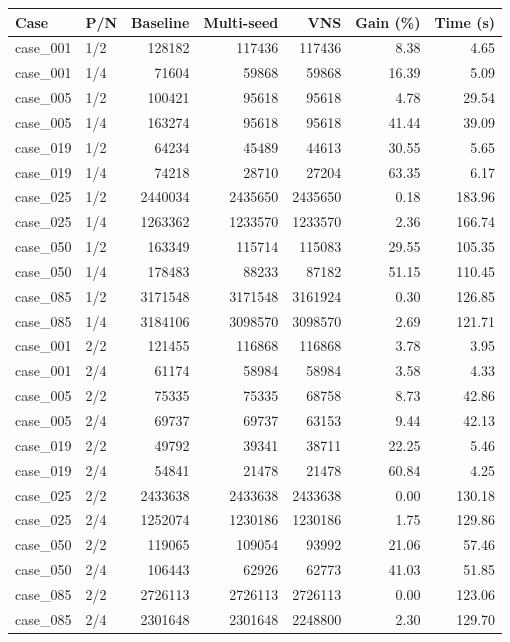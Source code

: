 \begin{tabular}{llrrrrr}
\toprule
Case & P/N & Baseline & Multi-seed & VNS & Gain (\%) & Time (s) \\
\midrule
case\_001 & 1/2 & 128182 & 117436 & 117436 & 8.38 & 4.65 \\
case\_001 & 1/4 & 71604 & 59868 & 59868 & 16.39 & 5.09 \\
case\_005 & 1/2 & 100421 & 95618 & 95618 & 4.78 & 29.54 \\
case\_005 & 1/4 & 163274 & 95618 & 95618 & 41.44 & 39.09 \\
case\_019 & 1/2 & 64234 & 45489 & 44613 & 30.55 & 5.65 \\
case\_019 & 1/4 & 74218 & 28710 & 27204 & 63.35 & 6.17 \\
case\_025 & 1/2 & 2440034 & 2435650 & 2435650 & 0.18 & 183.96 \\
case\_025 & 1/4 & 1263362 & 1233570 & 1233570 & 2.36 & 166.74 \\
case\_050 & 1/2 & 163349 & 115714 & 115083 & 29.55 & 105.35 \\
case\_050 & 1/4 & 178483 & 88233 & 87182 & 51.15 & 110.45 \\
case\_085 & 1/2 & 3171548 & 3171548 & 3161924 & 0.30 & 126.85 \\
case\_085 & 1/4 & 3184106 & 3098570 & 3098570 & 2.69 & 121.71 \\
case\_001 & 2/2 & 121455 & 116868 & 116868 & 3.78 & 3.95 \\
case\_001 & 2/4 & 61174 & 58984 & 58984 & 3.58 & 4.33 \\
case\_005 & 2/2 & 75335 & 75335 & 68758 & 8.73 & 42.86 \\
case\_005 & 2/4 & 69737 & 69737 & 63153 & 9.44 & 42.13 \\
case\_019 & 2/2 & 49792 & 39341 & 38711 & 22.25 & 5.46 \\
case\_019 & 2/4 & 54841 & 21478 & 21478 & 60.84 & 4.25 \\
case\_025 & 2/2 & 2433638 & 2433638 & 2433638 & 0.00 & 130.18 \\
case\_025 & 2/4 & 1252074 & 1230186 & 1230186 & 1.75 & 129.86 \\
case\_050 & 2/2 & 119065 & 109054 & 93992 & 21.06 & 57.46 \\
case\_050 & 2/4 & 106443 & 62926 & 62773 & 41.03 & 51.85 \\
case\_085 & 2/2 & 2726113 & 2726113 & 2726113 & 0.00 & 123.06 \\
case\_085 & 2/4 & 2301648 & 2301648 & 2248800 & 2.30 & 129.70 \\
\bottomrule
\end{tabular}
